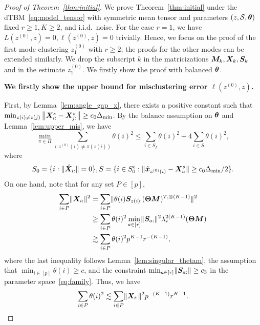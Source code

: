 \documentclass[journal]{IEEEtran}
\theoremstyle{definition}
\theoremstyle{definition}
\begin{document}
\begin{proof}[Proof of Theorem~\ref{thm:initial}] We prove Theorem~\ref{thm:initial} under the dTBM~\eqref{eq:model_tensor} with symmetric mean tensor and parameters $(z, \mathcal{S}, \boldsymbol{\theta})$ {fixed $r\geq 1, K \geq 2$}, and i.i.d.\ noise. {For the case $r = 1$, we have $L(z^{(0)},z) = 0, \ell(z^{(0)}, z) = 0$ trivially. Hence, we focus on the proof of the first mode clustering $z^{(0)}_1$ with $r \geq 2$}; 
the proofs for the other modes can be extended similarly. We drop the subscript $k$ in the matricizations $\bm M_k, \bm X_k, \bm S_k$ and in the estimate $z^{(0)}_1$. We firstly show the proof with balanced $\boldsymbol{\theta}$.

\textbf{We firstly show the upper bound for misclustering error $\ell(z^{(0)}, z)$.}

First, by Lemma~\ref{lem:angle_gap_x}, there exists a positive constant such that $\min_{z(i) \neq z(j)} \left\lVert \bm X^s_{i:} - \bm X^s_{j:} \right\rVert \geq c_0  \Delta_{\min}$. By the balance assumption on $\boldsymbol{\theta}$ and Lemma~\ref{lem:upper_mis}, we have 
 \begin{equation}\label{eq:theta_bound}
          \min_{\pi \in \Pi} \sum_{i : z^{(0)}(i) \neq \pi(z(i))} \theta(i)^2  \leq  \sum_{i \in S_I} \theta(i)^2 + 4 \sum_{i \in S} \theta(i)^2 ,
    \end{equation}
    where 
    \small
    \begin{equation}
        S_0 = \{i: \lVert\hat {\bm X}_{i:}\rVert = 0\}, S = \{i \in S_0^c: \lVert\hat {\bm x}_{z^{(0)}(i)} - \bm X_{i:}^s \rVert \geq c_0  \Delta_{\min}/2\}.
    \end{equation}
    \normalsize
    On one hand, note that for any set $P \in [p]$,
    \begin{align}
        \sum_{i \in P} \lVert\bm X_{i:}\rVert^2 &= \sum_{i \in P} \lVert \theta(i) \bm S_{z(i):} (\boldsymbol{\Theta} \bm M)^{T, \otimes (K-1)} \rVert^2 \\
        & \geq \sum_{i \in P} \theta(i)^2 \min_{a \in [r]} \lVert\bm S_{a:}\rVert^2 \lambda_{r}^{2(K-1)} (\boldsymbol{\Theta} \bm M)\\
        & \gtrsim \sum_{i \in P} \theta(i)^2 p^{K-1} r^{-(K-1)}, 
    \end{align}
    where the last inequality follows Lemma~\ref{lem:singular_thetam}, the assumption that $\min_{i \in [p]} \theta(i) \geq c$, and the constraint $\min_{a \in [r]} \lVert\bm S_{a:}\rVert \geq c_3$ in the parameter space~\eqref{eq:family}. Thus, we have 
    \begin{equation}\label{eq:theta_p}
        \sum_{i \in P} \theta(i)^2 \lesssim \sum_{i \in P} \onormSize{}{\mX_{i:}}^2 p^{-(K-1)} r^{K-1}.
    \end{equation}
    

\end{proof}
\end{document}
